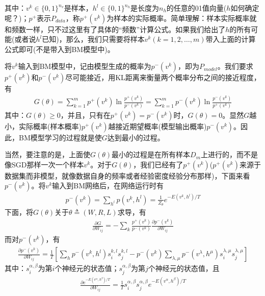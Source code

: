             其中：$v^k\in \{0,1\}^{n_v}$是样本，$h^l\in \{0,1\}^{n_h}$是长度为$n_h$的任意的01值向量($h$如何确定呢？)；$p^+$表示$P_{data}$，称$p^+(v^k)$为样本的实际概率。简单理解：样本实际概率就和频数一样，只不过这里有了具体的“频数”计算公式。如果我们给出了$h$的所有可能(或者说$h^l$已知)，那么，我们只需要将样本$v^k(k=1,2,\dots,m)$带入上面的计算公式即可(不是带入到BM模型中)。
            \par
            将$v^k$输入到BM模型中，记由模型生成的概率为$p^{-}(v^k)$，即为$P_{model}$。我们要求$p^+(v^k)$和$p^-(v^k)$尽可能接近，用KL距离来衡量两个概率分布之间的接近程度，有
            \begin{align*}
            G(\theta) = \sum_{k=1}^m p^+(v^k) \ln \frac{p^+(v^k)}{p^-(v^k)} = \sum_{k=1}^m p^-(v^k)\ln \frac{p^-(v^k)}{p^+(v^k)}
            \end{align*}
            其中：$G(\theta) \geqslant 0$，并且，只有在$p^+(v^k) = p^-(v^k)$时，$G(\theta) = 0$。显然$G$越小，实际概率(样本概率)$p^+(v^k)$越接近期望概率(模型输出概率)$p^-(v^k)$。因此，BM模型学习的过程就是使$G$达到最小的过程。
            \par
            当然，要注意的是，上面使$G(\theta)$最小的过程是在所有样本$D_m$上进行的，而不是像SGD那样一次一个样本$v^k$。对于$G(\theta)$，我们已经有了$p^+(v^k)$($p^+(v^k)$来源于数据集而非模型，就像数据自身的频率或者经验密度经验分布那样)，下面来看$p^-(v^k)$。将$v^k$输入到BM网络后，在网络运行时有
            \begin{align*}
            p^-(v^k) = \sum_{h^l}p(v^k,h^l) = \frac{1}{Z_\theta} e^{-E(v^k,h^l)/T}
            \end{align*}
            下面，将$G(\theta)$关于$\theta\triangleq (W,R,L)$求导，有
            \begin{align*}
            \frac{\partial G}{\partial W_{ij}} = -\sum_k \frac{p^+(v^k)}{p^-(v^k)}\frac{\partial p^-(v^k)}{\partial W_{ij}}
            \end{align*}
            而对$p^-(v^k)$，有
            \begin{align*}
            \frac{\partial p^-(v^k)}{\partial W_{ij}} = \frac{1}{T} \left[ \sum_h p^-(v^k,h^l)s_i^{k,l} s_j^{k,l} - p^-(v^k)\sum_{\lambda,\mu}p^-(v^\lambda,h^\mu)s_i^{\lambda,\mu}s_j^{\lambda,\mu} \right]
            \end{align*}
            其中：$s_i^{\alpha,\beta}$为第$i$个神经元的状态值；$s_j^{\alpha,\beta}$为第$j$个神经元的状态值，且
            \begin{align*}
            \frac{\partial e^{-E(v^\alpha,h^\beta)/T}}{\partial W_{ij}} = \frac{1}{T}s_i^{\alpha,\beta}s_j^{\alpha,\beta}e^{-E(v^\alpha,h^\beta)/T}
            \end{align*}
